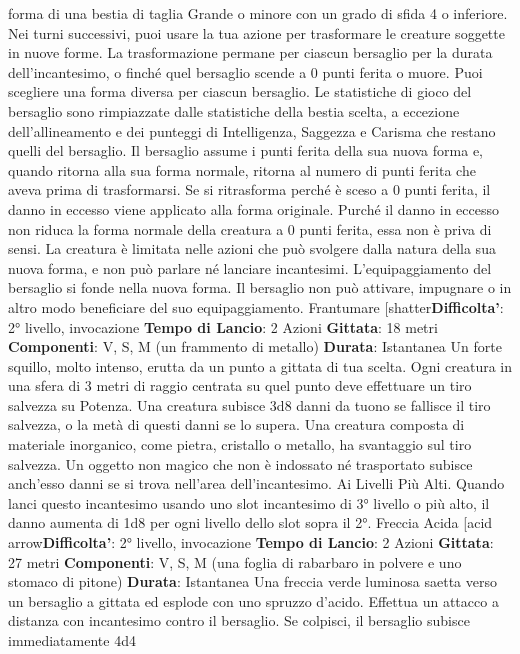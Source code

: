\begin{multicols}{2}
forma di una bestia di taglia Grande o minore con un
grado di sfida 4 o inferiore. Nei turni successivi, puoi
usare la tua azione per trasformare le creature soggette
in nuove forme.
La trasformazione permane per ciascun bersaglio per la
durata dell’incantesimo, o finché quel bersaglio scende
a 0 punti ferita o muore. Puoi scegliere una forma
diversa per ciascun bersaglio. Le statistiche di gioco del
bersaglio sono rimpiazzate dalle statistiche della bestia
scelta, a eccezione dell’allineamento e dei punteggi di
Intelligenza, Saggezza e Carisma che restano quelli del
bersaglio. Il bersaglio assume i punti ferita della sua
nuova forma e, quando ritorna alla sua forma normale,
ritorna al numero di punti ferita che aveva prima di
trasformarsi. Se si ritrasforma perché è sceso a 0 punti
ferita, il danno in eccesso viene applicato alla forma
originale. Purché il danno in eccesso non riduca la
forma normale della creatura a 0 punti ferita, essa non
è priva di sensi. La creatura è limitata nelle azioni che
può svolgere dalla natura della sua nuova forma, e non
può parlare né lanciare incantesimi.
L’equipaggiamento del bersaglio si fonde nella nuova
forma. Il bersaglio non può attivare, impugnare o in altro
modo beneficiare del suo equipaggiamento.
Frantumare
[shatter\textbf{Difficolta'}:
2° livello, invocazione
\textbf{Tempo di Lancio}: 2 Azioni
\textbf{Gittata}: 18 metri
\textbf{Componenti}: V, S, M (un frammento di metallo)
\textbf{Durata}: Istantanea
Un forte squillo, molto intenso, erutta da un punto a
gittata di tua scelta. Ogni creatura in una sfera di 3
metri di raggio centrata su quel punto deve effettuare
un tiro salvezza su Potenza. Una creatura subisce
3d8 danni da tuono se fallisce il tiro salvezza, o la metà
di questi danni se lo supera. Una creatura composta di
materiale inorganico, come pietra, cristallo o metallo, ha
svantaggio sul tiro salvezza.
Un oggetto non magico che non è indossato né
trasportato subisce anch’esso danni se si trova
nell’area dell’incantesimo.
Ai Livelli Più Alti. Quando lanci questo incantesimo
usando uno slot incantesimo di 3° livello o più alto, il
danno aumenta di 1d8 per ogni livello dello slot sopra il
2°.
Freccia Acida
[acid arrow\textbf{Difficolta'}:
2° livello, invocazione
\textbf{Tempo di Lancio}: 2 Azioni
\textbf{Gittata}: 27 metri
\textbf{Componenti}: V, S, M (una foglia di rabarbaro in
polvere e uno stomaco di pitone)
\textbf{Durata}: Istantanea
Una freccia verde luminosa saetta verso un bersaglio a
gittata ed esplode con uno spruzzo d’acido. Effettua un
attacco a distanza con incantesimo contro il bersaglio.
Se colpisci, il bersaglio subisce immediatamente 4d4

\end{multicols}
